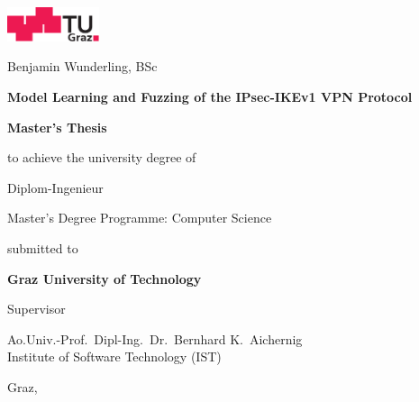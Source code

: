 \begin{center}
\includegraphics[height=1cm]{diagrams/tugraz-logo.pdf}

\vspace{3cm}

{\Large\sffamily Benjamin Wunderling, BSc}

\vspace{1cm}

\begin{spacing}{1.1}
\huge\sffamily\bfseries
Model Learning and Fuzzing of the IPsec-IKEv1 VPN Protocol\\
\end{spacing}

\vspace{3cm}


{\Large\sffamily\bfseries Master's Thesis}

\vspace{5mm}

{\small\sffamily to achieve the university degree of}

\vspace{5mm}

{\normalsize\sffamily Diplom-Ingenieur}

\vspace{5mm}

{\normalsize\sffamily
Master's Degree Programme: Computer Science
}


\vspace{1cm}

{\small\sffamily submitted to}

\vspace{5mm}

{\large\sffamily\bfseries Graz University of Technology}



\vspace{1cm}

{\small\sffamily Supervisor}

\vspace{5mm}

{\normalsize\sffamily
Ao.Univ.-Prof.\ Dipl-Ing.\ Dr.\ Bernhard K.~Aichernig \\
Institute of Software Technology (IST)
}


\vspace{1cm}

{\normalsize\sffamily Graz, \thisdate}



\vfill


\end{center}





